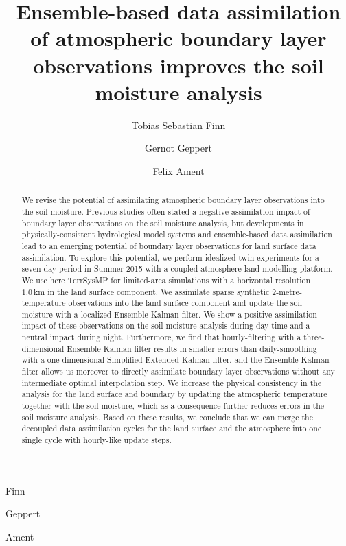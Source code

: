 \documentclass[hess, manuscript]{copernicus}
\begin{document}
\title{
	Ensemble-based data assimilation of atmospheric boundary layer observations improves the soil moisture analysis
}
\author[1,2,3]{Tobias Sebastian Finn}{Finn}
\author[4]{Gernot Geppert}{Geppert}
\author[1,5]{Felix Ament}{Ament}






%
%
%

\maketitle

\begin{abstract}
	We revise the potential of assimilating atmospheric boundary layer observations into the soil moisture.
	Previous studies often stated a negative assimilation impact of boundary layer observations on the soil moisture analysis, but developments in physically-consistent hydrological model systems and ensemble-based data assimilation lead to an emerging potential of boundary layer observations for land surface data assimilation.
	To explore this potential, we perform idealized twin experiments for a seven-day period in Summer 2015 with a coupled atmosphere-land modelling platform.
	We use here TerrSysMP for limited-area simulations with a horizontal resolution $1.0\,\text{km}$ in the land surface component.
	We assimilate sparse synthetic 2-metre-temperature observations into the land surface component and update the soil moisture with a localized Ensemble Kalman filter.
	We show a positive assimilation impact of these observations on the soil moisture analysis during day-time and a neutral impact during night.
	Furthermore, we find that hourly-filtering with a three-dimensional Ensemble Kalman filter results in smaller errors than daily-smoothing with a one-dimensional Simplified Extended Kalman filter, and the Ensemble Kalman filter allows us moreover to directly assimilate boundary layer observations without any intermediate optimal interpolation step.
	We increase the physical consistency in the analysis for the land surface and boundary by updating the atmospheric temperature together with the soil moisture, which as a consequence further reduces errors in the soil moisture analysis.
	Based on these results, we conclude that we can merge the decoupled data assimilation cycles for the land surface and the atmosphere into one single cycle with hourly-like update steps.
\end{abstract}
\end{document}
